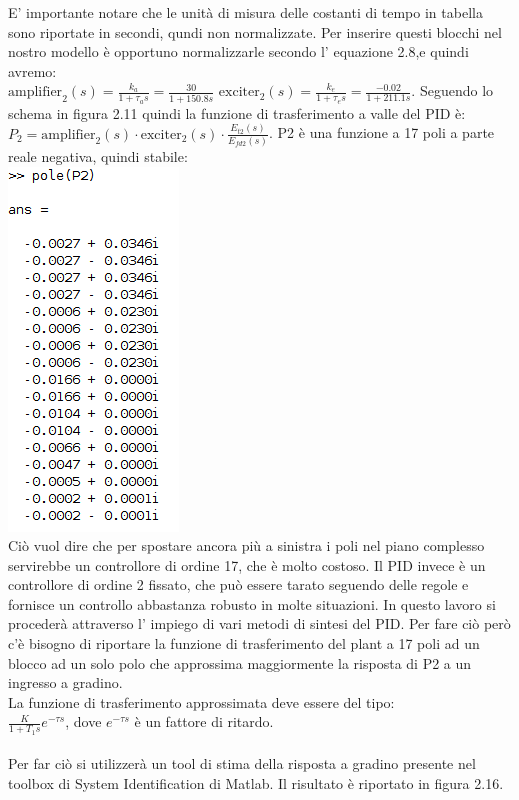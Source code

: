 \documentclass[Lau,noexaminfo]{sapthesis}
\begin{document}
 	E' importante notare che le unità di misura delle costanti di tempo in tabella sono riportate in secondi, qundi non normalizzate. Per inserire questi blocchi nel nostro modello è opportuno normalizzarle secondo l' equazione 2.8,e quindi avremo:\\ $\text{amplifier}_2(s)=\frac{k_a}{1+\tau_as}=\frac{30}{1+150.8s}$ \qquad $\text{exciter}_2(s)=\frac{k_e}{1+\tau_es}=\frac{-0.02}{1+211.1s}$.
 	Seguendo lo schema in figura 2.11 quindi la funzione di trasferimento a valle del PID è:\\
 	$P_2=\text{amplifier}_2(s)\cdot\text{exciter}_2(s)\cdot\frac{E_{t2}(s)}{E_{fd2}(s)}$. P2 è una funzione a 17 poli a parte reale negativa, quindi stabile:\\
 	\includegraphics[height=0.26\textheight]{poli_p2}\\
 	Ciò vuol dire che per spostare ancora più a sinistra i poli nel piano complesso servirebbe un controllore di ordine 17, che è molto costoso. Il PID invece è un controllore di ordine 2 fissato, che può essere tarato seguendo delle regole e fornisce un controllo abbastanza robusto in molte situazioni. In questo lavoro si procederà attraverso l' impiego di vari metodi di sintesi del PID. Per fare ciò però c'è bisogno di riportare la funzione di trasferimento del plant a 17 poli ad un blocco ad un solo polo che approssima maggiormente la risposta di P2 a un ingresso a gradino.\\
 	La funzione di trasferimento approssimata deve essere del tipo:\\
 	$\frac{K}{1+T_1 s} e^{-\tau s}$, dove $e^{-\tau s}$ è un fattore di ritardo.\\\\Per far ciò si utilizzerà un tool di stima della risposta a gradino presente nel toolbox di System Identification di Matlab. Il risultato è riportato in figura 2.16.\\
\end{document}

